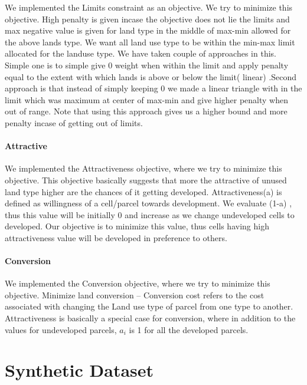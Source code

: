 \documentclass[12pt]{article} %
\begin{document}
We implemented the Limits constraint as an  objective. We try to minimize this objective. High penalty is given incase the objective does not lie the limits and max negative value is given for land type in the middle of max-min allowed for the above lands type. We want all land use type to be within the min-max limit allocated for the landuse type. We have taken couple of approaches in this. Simple one is to simple give 0 weight when within the limit and apply penalty equal to the extent with which lands is above or below the limit( linear) .Second approach is that instead of simply keeping 0 we made a linear triangle with in the limit which was maximum at center of max-min and give higher penalty when out of range. Note that using this approach gives us a higher bound and more penalty incase of getting out of limits. 

\paragraph*{Attractive}

We implemented the Attractiveness  objective, where we try to minimize this objective. This objective basically suggests that more the attractive of unused land type higher are the chances of it getting developed. Attractiveness(a) is defined as willingness of a cell/parcel towards development. We evaluate (1-a) , thus this value will be initially 0 and increase as we change undeveloped cells to developed. Our objective is to minimize this value, thus cells having high attractiveness value will be developed in preference to others.

\paragraph*{Conversion}

We implemented the Conversion  objective, where we try to minimize this objective. Minimize land conversion -- Conversion cost refers to the cost associated with changing the Land use type of parcel from one type to another. Attractiveness is basically a special case for conversion, where in addition to the values for undeveloped parcels, $a_i$ is 1 for all the developed parcels.\\


\section{Synthetic Dataset}
\end{document}
